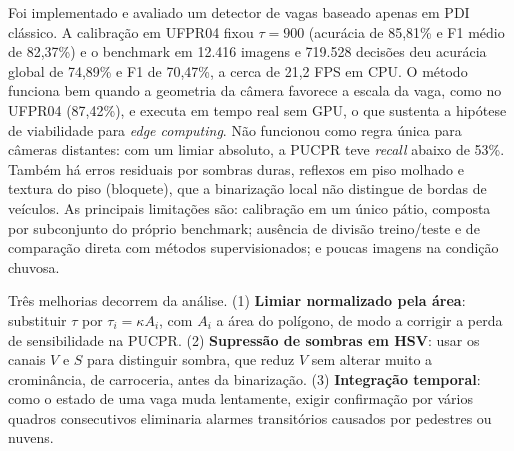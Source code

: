\documentclass[
	article,			%
	11pt,				%
	oneside,			%
	a4paper,			%
	english,			%
	brazil,				%
	sumario=tradicional
	]{abntex2}
\begin{document}
Foi implementado e avaliado um detector de vagas baseado apenas em PDI clássico. A calibração em UFPR04 fixou $\tau=900$ (acurácia de 85,81\% e F1 médio de 82,37\%) e o benchmark em 12.416 imagens e 719.528 decisões deu acurácia global de 74,89\% e F1 de 70,47\%, a cerca de 21,2 FPS em CPU. O método funciona bem quando a geometria da câmera favorece a escala da vaga, como no UFPR04 (87,42\%), e executa em tempo real sem GPU, o que sustenta a hipótese de viabilidade para \textit{edge computing}. Não funcionou como regra única para câmeras distantes: com um limiar absoluto, a PUCPR teve \textit{recall} abaixo de 53\%. Também há erros residuais por sombras duras, reflexos em piso molhado e textura do piso (bloquete), que a binarização local não distingue de bordas de veículos. As principais limitações são: calibração em um único pátio, composta por subconjunto do próprio benchmark; ausência de divisão treino/teste e de comparação direta com métodos supervisionados; e poucas imagens na condição chuvosa.

Três melhorias decorrem da análise. (1) \textbf{Limiar normalizado pela área}: substituir $\tau$ por $\tau_i=\kappa A_i$, com $A_i$ a área do polígono, de modo a corrigir a perda de sensibilidade na PUCPR. (2) \textbf{Supressão de sombras em HSV}: usar os canais $V$ e $S$ para distinguir sombra, que reduz $V$ sem alterar muito a crominância, de carroceria, antes da binarização. (3) \textbf{Integração temporal}: como o estado de uma vaga muda lentamente, exigir confirmação por vários quadros consecutivos eliminaria alarmes transitórios causados por pedestres ou nuvens.


\postextual

\end{document}
